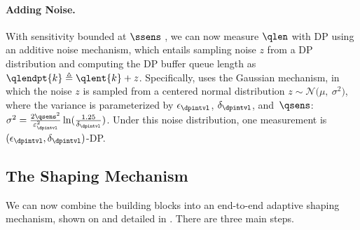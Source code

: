 \paragraph{Adding Noise.}
With sensitivity bounded at $\ssens$ , we can now measure $\qlen$
with DP using
an additive noise mechanism, which entails sampling noise $z$ from a DP
distribution and computing the DP buffer queue length as $\qlendpt{k} \triangleq
\qlent{k} + z$.
Specifically, {\sys} uses the Gaussian mechanism, in which
the noise $z$ is sampled from a centered normal distribution
$z \sim \mathcal{N}\big(\mu,~\sigma^2\big)$, where the variance is parameterized by
$\epsilon_\dpintvl$, $\delta_\dpintvl$, and~$\qsens$:
$\sigma^2 = \frac{2\qsens^2}{\varepsilon_\dpintvl^2}\ln(\frac{1.25}{\delta_\dpintvl})$.
Under this noise distribution, one measurement is \mbox{$(\epsilon_\dpintvl,
\delta_\dpintvl)$-DP}.


\subsection{The Shaping Mechanism}
\label{subsec:dp-queue-measurements}

We can now combine the building blocks into an end-to-end adaptive shaping
mechanism, shown on  and detailed in .
There are three main steps.

